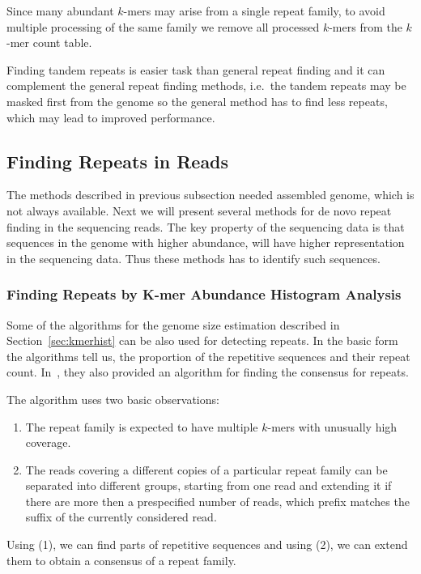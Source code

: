 Since many abundant $k$-mers may arise from a single repeat family, to avoid multiple processing of the same family we remove all processed $k$-mers from the $k$-mer count table.

Finding tandem repeats is easier task than general repeat finding and it can complement the general repeat finding methods, i.e.\ the tandem repeats may be masked first from the genome so the general method has to find less repeats, which may lead to improved performance.

\subsection{Finding Repeats in Reads}\label{sect:repeats-reads}

The methods described in previous subsection needed assembled genome, which is not always available. Next we will present several methods for de novo repeat finding in the sequencing reads. The key property of the sequencing data is that sequences in the genome with higher abundance, will have higher representation in the sequencing data. Thus these methods has to identify such sequences.

\subsubsection{Finding Repeats by K-mer Abundance Histogram Analysis}

Some of the algorithms for the genome size estimation described in Section~\ref{sec:kmerhist} can be also used for detecting repeats.
In the basic form the algorithms tell us, the proportion of the repetitive sequences and their repeat count. In~\cite{waterman}, they also provided an algorithm for finding the consensus for repeats.

The algorithm uses two basic observations:

\begin{enumerate}
  \item The repeat family is expected to have multiple $k$-mers with  unusually high coverage.
  \item The reads covering a different copies of a particular repeat family can be separated into different groups, starting from one read and extending it if there are more then a prespecified number of reads, which prefix matches the suffix of the currently considered read.
\end{enumerate}

Using (1), we can find parts of repetitive sequences and using (2), we can extend them to obtain a consensus of a repeat family.

